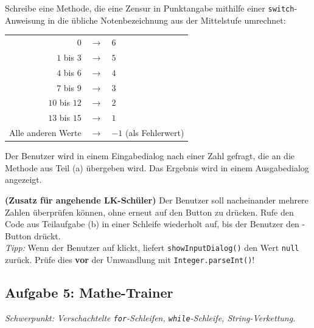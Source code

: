 \begin{compactenum}[a)]
\item Schreibe eine Methode, die eine Zensur in Punktangabe mithilfe einer
\lstinline|switch|-Anweisung in die übliche Notenbezeichnung aus der
Mittelstufe umrechnet:

\medskip
\begin{tabular}{rcl}
$0$ & $\rightarrow$ & $6$ \\
$1$ bis $3$ & $\rightarrow$ & $5$ \\
$4$ bis $6$ & $\rightarrow$ & $4$ \\
$7$ bis $9$ & $\rightarrow$ & $3$ \\
$10$ bis $12$ & $\rightarrow$ & $2$ \\
$13$ bis $15$ & $\rightarrow$ & $1$ \\
Alle anderen Werte & $\rightarrow$ & $-1$ (als Fehlerwert) \\
\end{tabular}

\item Der Benutzer wird in einem Eingabedialog nach einer Zahl gefragt, die an
die Methode aus Teil (a) übergeben wird. Das Ergebnis wird in einem
Ausgabedialog angezeigt.

\item \textbf{(Zusatz für angehende LK-Schüler)} Der Benutzer soll
nacheinander mehrere Zahlen überprüfen können, ohne erneut auf den Button zu
drücken. Rufe den Code aus Teilaufgabe (b) in einer Schleife wiederholt auf,
bis der Benutzer den -Button drückt.\\
\emph{Tipp:} Wenn der Benutzer auf  klickt, liefert
\lstinline|showInputDialog()| den Wert \lstinline|null| zurück. Prüfe dies
\textbf{vor} der Umwandlung mit \lstinline|Integer.parseInt()|!
\end{compactenum}


\subsection{Aufgabe 5: Mathe-Trainer \tagLK}
\noindent \emph{Schwerpunkt: Verschachtelte \texttt{for}-Schleifen,
\texttt{while}-Schleife, String-Verkettung.}

